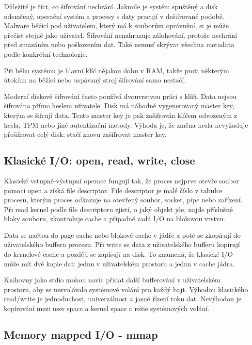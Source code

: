 Důležité je říct, co šifrování nechrání. Jakmile je systém spuštěný a disk odemčený, operační systém a procesy s daty pracují v dešifrované podobě. Malware běžící pod uživatelem, který má k souborům oprávnění, si je může přečíst stejně jako uživatel. Šifrování nenahrazuje zálohování, protože nechrání před smazáním nebo poškozením dat. Také nemusí skrývat všechna metadata podle konkrétní technologie.

Při běhu systému je hlavní klíč nějakou dobu v RAM, takže proti některým útokům na běžící nebo uspávaný stroj šifrování samo nestačí.

Moderní diskové šifrování často používá dvouvrstvou práci s klíči. Data nejsou šifrována přímo heslem uživatele. Disk má náhodně vygenerovaný master key, kterým se šifrují data. Tento master key je pak zašifrován klíčem odvozeným z hesla, TPM nebo jiné autentizační metody. Výhoda je, že změna hesla nevyžaduje přešifrovat celý disk; stačí znovu zašifrovat master key.

\subsection*{Klasické I/O: open, read, write, close}

Klasické vstupně-výstupní operace fungují tak, že proces nejprve otevře soubor pomocí open a získá file descriptor. File descriptor je malé číslo v tabulce procesu, kterým proces odkazuje na otevřený soubor, socket, pipe nebo zařízení. Při read kernel podle file descriptoru zjistí, o jaký objekt jde, najde příslušné bloky souboru, zkontroluje cache a případně zadá I/O na blokovou vrstvu.

Data se načtou do page cache nebo blokové cache v jádře a poté se zkopírují do uživatelského bufferu procesu. Při write se data z uživatelského bufferu kopírují do kernelové cache a později se zapisují na disk. To znamená, že klasické I/O může mít dvě kopie dat: jednu v uživatelském prostoru a jednu v cache jádra.

Knihovny jako stdio mohou navíc přidat další bufferování v uživatelském prostoru, aby se nesvolávalo systémové volání pro každý bajt. Výhodou klasického read/write je jednoduchost, univerzálnost a jasné řízení toku dat. Nevýhodou je kopírování mezi user space a kernel space a režie systémových volání.

\subsection*{Memory mapped I/O - mmap}

